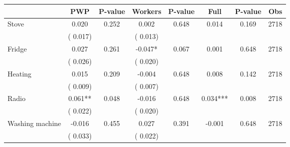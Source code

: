 
\begin{tabular}{l*{7}{c}}\hline&\multicolumn{1}{c}{PWP}&\multicolumn{1}{c}{P-value}&\multicolumn{1}{c}{Workers}&\multicolumn{1}{c}{P-value}&\multicolumn{1}{c}{Full}&\multicolumn{1}{c}{P-value}&\multicolumn{1}{c}{Obs} \\ \hline

 Stove       &              0.020       &        0.252  &              0.002       &        0.648  &              0.014       &              0.169 &  2718 \\ 
                       &       (       0.017)             &                               &       (       0.013)                     &                               &                                               &                                &                      \\ 

 Fridge       &              0.027       &        0.261  &             -0.047*       &        0.067  &              0.001       &              0.648 &  2718 \\ 
                       &       (       0.026)             &                               &       (       0.020)                     &                               &                                               &                                &                      \\ 

 Heating       &              0.015       &        0.209  &             -0.004       &        0.648  &              0.008       &              0.142 &  2718 \\ 
                       &       (       0.009)             &                               &       (       0.007)                     &                               &                                               &                                &                      \\ 

 Radio       &              0.061**       &        0.048  &             -0.016       &        0.648  &              0.034***       &              0.008 &  2718 \\ 
                       &       (       0.022)             &                               &       (       0.020)                     &                               &                                               &                                &                      \\ 

 Washing machine       &             -0.016       &        0.455  &              0.027       &        0.391  &             -0.001       &              0.648 &  2718 \\ 
                       &       (       0.033)             &                               &       (       0.022)                     &                               &                                               &                                &                      \\ 


\end{tabular}
